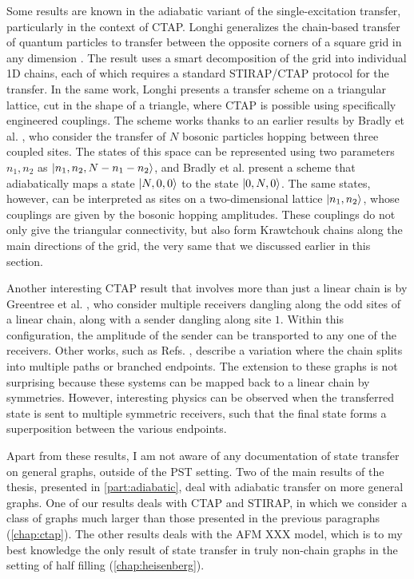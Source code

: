 Some results are known in the adiabatic variant of the single-excitation transfer, particularly in the context of CTAP. Longhi generalizes the chain-based transfer of quantum particles to transfer between the opposite corners of a square grid in any dimension \cite{Longhi2014}. The result uses a smart decomposition of the grid into individual 1D chains, each of which requires a standard STIRAP/CTAP protocol for the transfer. In the same work, Longhi presents a transfer scheme on a triangular lattice, cut in the shape of a triangle, where CTAP is possible using specifically engineered couplings. The scheme works thanks to an earlier results by Bradly et al. \cite{Bradly2012}, who consider the transfer of $N$ bosonic particles hopping between three coupled sites. 
The states of this space can be represented using two parameters $n_1, n_2$ as $\lvert n_1, n_2, N-n_1 - n_2 \rangle$, and Bradly et al. present a scheme that adiabatically maps a state $\lvert N, 0, 0\rangle$ to the state $\lvert0,N,0\rangle$. The same states, however, can be interpreted as sites on a two-dimensional lattice $\lvert n_1, n_2\rangle$, whose couplings are given by the bosonic hopping amplitudes. These couplings do not only give the triangular connectivity, but also form Krawtchouk chains along the main directions of the grid, the very same that we discussed earlier in this section. 

Another interesting CTAP result that involves more than just a linear chain is by Greentree et al. \cite{Greentree2006}, who consider multiple receivers dangling along the odd sites of a linear chain, along with a sender dangling along site $1$. Within this configuration, the amplitude of the sender can be transported to any one of the receivers. Other works, such as Refs. \cite{Chen2013,Batey2015}, describe a variation where the chain splits into multiple paths or branched endpoints. The extension to these graphs is not surprising because these systems can be mapped back to a linear chain by symmetries. However, interesting physics can be observed when the transferred state is sent to multiple symmetric receivers, such that the final state forms a superposition between the various endpoints. 

Apart from these results, I am not aware of any documentation of state transfer on general graphs, outside of the PST setting. Two of the main results of the thesis, presented in \cref{part:adiabatic}, deal with adiabatic transfer on more general graphs. One of our results deals with CTAP and STIRAP, in which we consider a class of graphs much larger than those presented in the previous paragraphs (\cref{chap:ctap}). The other results deals with the AFM XXX model, which is to my best knowledge the only result of state transfer in truly non-chain graphs in the setting of half filling (\cref{chap:heisenberg}). 


